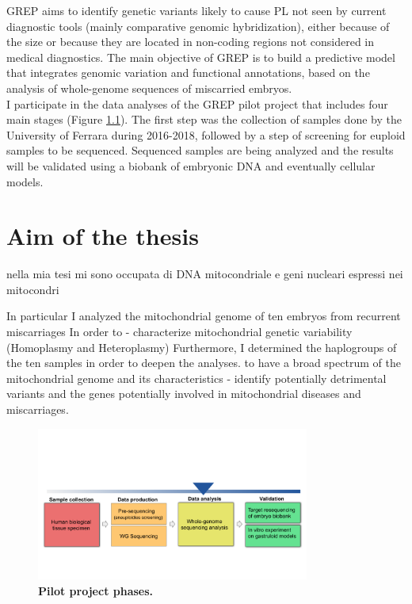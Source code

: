 GREP aims to identify genetic variants likely to cause PL not seen by current diagnostic tools (mainly comparative genomic hybridization), either because of the size or because they are located in non-coding regions not considered in medical diagnostics. The main objective of GREP is to build a predictive model that integrates genomic variation and functional annotations, based on the analysis of whole-genome sequences of miscarried embryos.\\
I participate in the data analyses of the GREP pilot project that includes four main stages (Figure \ref{fig:projectPhases}). The first step was the collection of samples done by the University of Ferrara during 2016-2018, followed by a step of screening for euploid samples to be sequenced. Sequenced samples are being analyzed and the results will be validated using a biobank of embryonic DNA and eventually cellular models.\\


\chapter{Aim of the thesis }


nella mia tesi mi sono occupata di DNA mitocondriale e geni nucleari espressi nei mitocondri 

In particular I analyzed the mitochondrial genome of ten embryos from recurrent miscarriages In order to 
- characterize mitochondrial genetic variability (Homoplasmy and Heteroplasmy) Furthermore, I determined the haplogroups of the ten samples in order to deepen the analyses. to have a broad spectrum of the mitochondrial genome and its characteristics
- identify potentially detrimental variants and the genes potentially involved in mitochondrial diseases and miscarriages.








\begin{figure}[H]
\centering
\includegraphics[width=0.80\textwidth]{Fig/projectPhases.png}
\decoRule
\caption{\textbf{Pilot project phases.}} 
\label{fig:projectPhases}
\end{figure}







